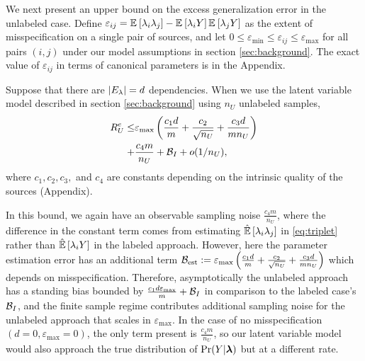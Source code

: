 We next present an upper bound on the excess generalization error in the unlabeled case. Define $\varepsilon_{ij} = \mathbb{E}_{}\left[\lambda_i \lambda_j\right] - \mathbb{E}_{}\left[\lambda_i Y\right] \mathbb{E}_{}\left[\lambda_j Y\right]$ as the extent of misspecification on a single pair of sources, and let $0 \le \varepsilon_{\min} \le \varepsilon_{ij} \le \varepsilon_{\max}$ for all pairs $(i, j)$ under our model assumptions in section \ref{sec:background}. The exact value of $\varepsilon_{ij}$ in terms of canonical parameters 
is in the Appendix. 
\begin{theorem}
Suppose that there are $|E_{\lambda}| = d$ dependencies. When we use the latent variable model described in section \ref{sec:background} using $n_U$ unlabeled samples, 
\begin{align}
    R_U^{e} \le  & \varepsilon_{\max} \left(\frac{c_1 d}{m} + \frac{c_2}{\sqrt{n_U}} + \frac{c_3d }{m n_U}\right) \\
    + &\frac{c_4 m}{n_U} + \mathcal{B}_I + o(1/n_U), \nonumber
\end{align}
where $c_1, c_2, c_3,$ and $c_4$ are constants depending on the intrinsic quality of the sources (Appendix). 
\label{thm:unlabeled}
\end{theorem}

In this bound, we again have an observable sampling noise $\frac{c_4 m}{n_U}$, where the difference in the constant term comes from estimating $\hat{\mathbb{E}}\left[\lambda_i \lambda_j\right]$ in \eqref{eq:triplet} rather than $\hat{\mathbb{E}}\left[\lambda_i Y\right]$ in the labeled approach. However, here the parameter estimation error has an additional term $\mathcal{B}_{\mathrm{est}} :=\varepsilon_{\max} \left(\frac{c_1 d}{m} + \frac{c_2 }{\sqrt{n_U}} + \frac{c_3 d}{m n_U}\right)$ which depends on misspecification. Therefore, asymptotically the unlabeled approach has a standing bias bounded by $\frac{c_1 d \varepsilon_{\max}}{m} +\mathcal{B}_I$ in comparison to the labeled case's $\mathcal{B}_I$, and the finite sample regime contributes additional sampling noise for the unlabeled approach that scales in $\varepsilon_{\max}$. In the case of no misspecification $(d = 0, \varepsilon_{\max} = 0)$, the only term present is $\frac{c_4 m}{n_U}$, so our latent variable model would also approach the true distribution of $\Pr(Y | \bm{\lambda})$ but at a different rate. 

\vspace{-0.5em}
